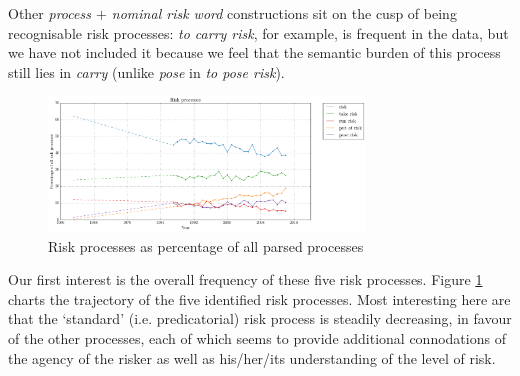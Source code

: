 Other \emph{process $+$ nominal risk word} constructions sit on the cusp of being recognisable risk processes: \emph{to carry risk}, for example, is frequent in the data, but we have not included it because we feel that the semantic burden of this process still lies in \emph{carry} (unlike \emph{pose} in \emph{to pose risk}).
%
\begin{figure}[htb!]
\centering
\includegraphics[width=0.75\textwidth]{../images/risk_processes.png}
\caption{Risk processes as percentage of all parsed processes}
\label{fig:riskprocesses}
\end{figure}
%
\noindent Our first interest is the overall frequency of these five risk processes. 
Figure \ref{fig:riskprocesses} charts the trajectory of the five identified risk processes. Most interesting here are that the `standard' (i.e. predicatorial) risk process is steadily decreasing, in favour of the other processes, each of which seems to provide additional connodations of the agency of the risker as well as his\slash her\slash its understanding of the level of risk. 

